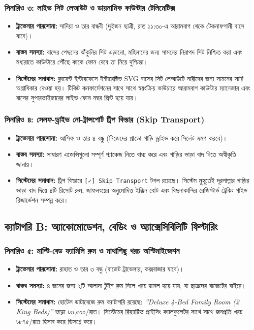 \documentclass[11pt,a4paper]{article}
\begin{document}
\subsubsection{সিনারিও ৩: লাইভ সিট লেআউট ও ডায়নামিক কাউন্টার টেলিমেটিক্স}
\begin{itemize}[leftmargin=*]
    \item \textbf{ট্রাভেলার পারসোনা:} সাদিয়া ও তার বান্ধবী (দুইজন ছাত্রী, রাত ১১:৩০-এ আরামবাগ থেকে টেকনাফগামী বাসে যাবে)।
    \item \textbf{বাস্তব সমস্যা:} বাসের পেছনের ঝাঁকুনির সিট এড়ানো, মহিলাদের জন্য সামনের নিরাপদ সিট নিশ্চিত করা এবং মধ্যরাতে কাউন্টারে পৌঁছে কাকে ফোন দেবে তা নিয়ে দুশ্চিন্তা।
    \item \textbf{সিস্টেমের সমাধান:} ক্লায়েন্ট ইন্টারফেসে ইন্টারেক্টিভ SVG বাসের সিট লেআউটে নারীদের জন্য সামনের সারি অগ্রাধিকার দেওয়া হয়। টিকিট কনফার্মেশনের সাথে সাথে স্বয়ংক্রিয় ভাউচারে আরামবাগ কাউন্টার ম্যানেজার এবং বাসের সুপারভাইজারের লাইভ ফোন নম্বর প্রিন্ট হয়ে যায়।
\end{itemize}

\subsubsection{সিনারিও ৪: সেলফ-ড্রাইভ নো-ট্রান্সপোর্ট ট্রিপ বিল্ডার (Skip Transport)}
\begin{itemize}[leftmargin=*]
    \item \textbf{ট্রাভেলার পারসোনা:} আসিফ ও তার ৪ বন্ধু (নিজেদের প্রাডো গাড়ি ড্রাইভ করে সিলেট ভ্রমণ করবে)।
    \item \textbf{বাস্তব সমস্যা:} সাধারণ এজেন্সিগুলো সম্পূর্ণ প্যাকেজ নিতে বাধ্য করে এবং গাড়ির ভাড়া বাদ দিতে অস্বীকৃতি জানায়।
    \item \textbf{সিস্টেমের সমাধান:} ট্রিপ বিল্ডারে \texttt{[✓] Skip Transport} টগল রয়েছে। সিস্টেম মুহূর্তেই দূরপাল্লার গাড়ির ভাড়া বাদ দিয়ে ৪টি রিসোর্ট রুম, জাফলংয়ের অনুমোদিত ইঞ্জিন বোট এবং বিছনাকান্দির রেজিস্টার্ড ট্রেকিং গাইড রিজার্ভেশন সম্পন্ন করে।
\end{itemize}

\subsection{ক্যাটাগরি B: অ্যাকোমোডেশন, বেডিং ও অ্যাক্সেসিবিলিটি ফিল্টারিং}

\subsubsection{সিনারিও ৫: মাল্টি-বেড ফ্যামিলি রুম ও মাথাপিছু খরচ অপ্টিমাইজেশন}
\begin{itemize}[leftmargin=*]
    \item \textbf{ট্রাভেলার পারসোনা:} রাহাত ও তার ৩ বন্ধু (বাজেট ট্রাভেলার, কক্সবাজার যাবে)।
    \item \textbf{বাস্তব সমস্যা:} ৪ জনের জন্য ২টি আলাদা টুইন রুম নিলে খরচ ডাবল হয়ে যায়, যা ছাত্রদের বাজেটের বাইরে।
    \item \textbf{সিস্টেমের সমাধান:} হোটেল ডাটাবেজে রুম ক্যাটাগরি রয়েছে: \textit{''Deluxe 4-Bed Family Room (2 King Beds)''} ভাড়া ৳৩,৫০০/রাত। সিস্টেমের রিয়্যাক্টিভ প্রাইসিং ক্যালকুলেটর সাথে সাথে জনপ্রতি খরচ ৳৮৭৫/রাত হিসাব করে ডিসপ্লে করে।
\end{itemize}
\end{document}
